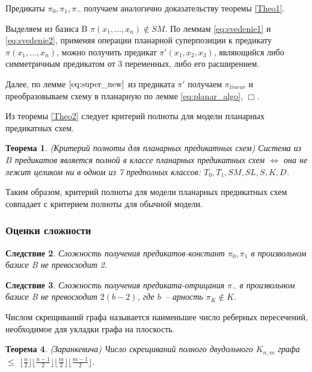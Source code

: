 \documentclass[12pt]{article}
\newtheorem{theorem}{Теорема}[section]
\newtheorem{corollary}[theorem]{Следствие}
\newenvironment{proof}[1][Доказательство]{\begin{trivlist}
\item[\hskip \labelsep {\bfseries #1}]}{\end{trivlist}}
\newenvironment{definition}[1][Определение]{\begin{trivlist}
\item[\hskip \labelsep {\bfseries #1}]}{\end{trivlist}}
\begin{document}
\begin{proof}
Предикаты $\pi_0, \pi_1, \pi_{\neg}$ получаем аналогично доказательству теоремы \ref{Theo1}.

Выделяем из базиса B $\pi(x_1, \dots, x_n) \notin SM$. По леммам \ref{eq:svedenie1} и \ref{eq:svedenie2}, 
применяя операции планарной суперпозиции к предикату $\pi(x_1, \dots, x_n)$, можно получить 
предикат $\pi'(x_1, x_2, x_3)$, являющийся либо симметричным предикатом от 3 переменных, либо его расширением. 

Далее, по лемме $\ref{eq:super_new}$ из предиката $\pi'$ получаем $\pi_{linear}$ и преобразовываем схему в планарную
по лемме \ref{eq:planar_algo}, $\Box$.
\end{proof}

Из теоремы \ref{Theo2} следует критерий полноты для модели планарных предикатных схем.

\begin{theorem}
(Критерий полноты для планарных предикатных схем)
Система из $B$ предикатов является полной в классе планарных предикатных схем $\iff$
она не лежит целиком ни в одном из 7 предполных классов: $T_0, T_1, SM, SL, S, K, D$. 
\end{theorem}

Таким образом, критерий полноты для модели планарных предикатных схем совпадает с критерием полноты для обычной модели.

\subsubsection{Оценки сложности}

\begin{corollary}
\label{corol:const}
Сложность получения предикатов-констант $\pi_0, \pi_1$ в произвольном базисе B не превосходит 2.
\end{corollary}

\begin{corollary}
\label{corol:negate}
Сложность получения предиката-отрицания $\pi_{\neg}$ в произвольном базисе B не превосходит $2(b-2)$, 
где $b$~-- арность $\pi_K \notin K$.
\end{corollary}

\begin{definition}
Числом скрещиваний графа называется наименьшее число реберных пересечений, необходимое для укладки графа на плоскость.
\end{definition}

\begin{theorem}
\label{ZarankTheorem}
(Заранкевича) Число скрещиваний полного двудольного $K_{n,m}$ графа $\leq$
$\lfloor \frac{n}{2} \rfloor \lfloor \frac{n-1}{2} \rfloor \lfloor \frac{m}{2} \rfloor \lfloor \frac{m-1}{2} \rfloor$.
\cite{Zarank54}
\end{theorem}
\end{document}
